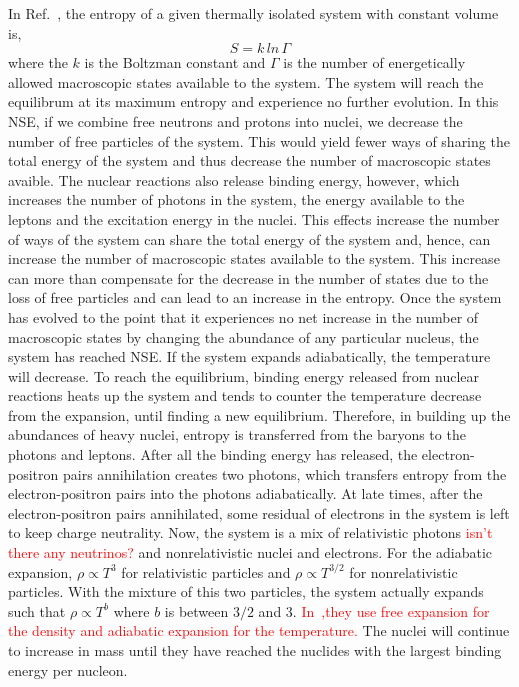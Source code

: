 \documentclass[
reprint,
preprintnumbers,
 amsmath,
 amssymb,
 aps,
onecolumn,
prd,
]{revtex4-2}
\begin{document}
In Ref.~\citet{Meyer1994Ther}, the entropy of a given thermally isolated system with constant volume is,
\begin{equation}
S = k \,ln\, \Gamma 
\end{equation}
where the $k$ is the Boltzman constant and $\Gamma$ is the number of energetically allowed macroscopic states available to the system.
The system will reach the equilibrum at its maximum entropy and experience no further evolution.
In this NSE, if we combine free neutrons and protons into nuclei, we decrease the number of free particles of the system. 
This would yield fewer ways of sharing the total energy of the system and thus decrease the number of macroscopic states avaible. 
The nuclear reactions also release binding energy, however, which increases the number of photons in the system, the energy available to the leptons and the excitation energy in the nuclei.
This effects increase the number of ways of the system can share the total energy of the system and, hence, can increase the number of macroscopic states available to the system. 
This increase can more than compensate for the decrease in the number of states due to the loss of free particles and can lead to an increase in the entropy. 
Once the system has evolved to the point that it experiences no net increase in the number of macroscopic states by changing the abundance of any particular nucleus, the system has reached NSE.  
If the system expands adiabatically, the temperature will decrease. 
To reach the equilibrium, binding energy released from nuclear reactions heats up the system and tends to counter the temperature decrease from the expansion, until finding a new equilibrium. 
Therefore, in building up the abundances of heavy nuclei, entropy is transferred from the baryons to the photons and leptons.
After all the binding energy has released, the electron-positron pairs annihilation creates two photons, which transfers entropy from the electron-positron pairs into the photons adiabatically. 
At late times, after the electron-positron pairs annihilated, some residual of electrons in the system is left to keep charge neutrality. 
Now, the system is a mix of relativistic photons \textcolor{red}{isn't there any neutrinos?} and nonrelativistic nuclei and electrons.
For the adiabatic expansion, $\rho \propto T^3$ for relativistic particles and $\rho \propto T^{3/2}$ for nonrelativistic particles. 
With the mixture of this two particles, the system actually expands such that $\rho \propto T^b$ where $b$ is between $3/2$ and $3$. 
\textcolor{red}{In~\citet{Martin2016Impact,Korobkin2012Onthe},they use free expansion for the density and adiabatic expansion for the temperature.}
The nuclei will continue to increase in mass until they have reached the nuclides with the largest binding energy per nucleon.
%
\end{document}
